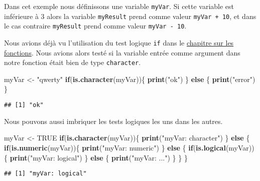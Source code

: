 \documentclass[]{book}
\newenvironment{Shaded}{\begin{snugshade}}{\end{snugshade}}
\newcommand{\KeywordTok}[1]{\textcolor[rgb]{0.13,0.29,0.53}{\textbf{#1}}}
\newcommand{\StringTok}[1]{\textcolor[rgb]{0.31,0.60,0.02}{#1}}
\newcommand{\OtherTok}[1]{\textcolor[rgb]{0.56,0.35,0.01}{#1}}
\newcommand{\ControlFlowTok}[1]{\textcolor[rgb]{0.13,0.29,0.53}{\textbf{#1}}}
\newcommand{\NormalTok}[1]{#1}
\theoremstyle{definition}
\theoremstyle{definition}
\theoremstyle{definition}
\theoremstyle{remark}
\begin{document}
Dans cet exemple nous définissons une variable \texttt{myVar}. Si cette
variable est inférieure à 3 alors la variable \texttt{myResult} prend
comme valeur \texttt{myVar\ +\ 10}, et dans le cas contraire
\texttt{myResult} prend comme valeur \texttt{myVar\ -\ 10}.

Nous avions déjà vu l'utilisation du test logique \texttt{if} dans le
\protect\hyperlink{l015function}{chapitre sur les fonctions}. Nous
avions alors testé si la variable entrée comme argument dans notre
fonction était bien de type \texttt{character}.

\begin{Shaded}
\begin{Highlighting}[]
\NormalTok{myVar <-}\StringTok{ "qwerty"}
\ControlFlowTok{if}\NormalTok{(}\KeywordTok{is.character}\NormalTok{(myVar))\{}
  \KeywordTok{print}\NormalTok{(}\StringTok{"ok"}\NormalTok{)}
\NormalTok{\} }\ControlFlowTok{else}\NormalTok{ \{}
  \KeywordTok{print}\NormalTok{(}\StringTok{"error"}\NormalTok{)}
\NormalTok{\}}
\end{Highlighting}
\end{Shaded}

\begin{verbatim}
## [1] "ok"
\end{verbatim}

Nous pouvons aussi imbriquer les tests logiques les uns dans les autres.

\begin{Shaded}
\begin{Highlighting}[]
\NormalTok{myVar <-}\StringTok{ }\OtherTok{TRUE}
\ControlFlowTok{if}\NormalTok{(}\KeywordTok{is.character}\NormalTok{(myVar))\{}
  \KeywordTok{print}\NormalTok{(}\StringTok{"myVar: character"}\NormalTok{)}
\NormalTok{\} }\ControlFlowTok{else}\NormalTok{ \{}
  \ControlFlowTok{if}\NormalTok{(}\KeywordTok{is.numeric}\NormalTok{(myVar))\{}
    \KeywordTok{print}\NormalTok{(}\StringTok{"myVar: numeric"}\NormalTok{)}
\NormalTok{  \} }\ControlFlowTok{else}\NormalTok{ \{}
    \ControlFlowTok{if}\NormalTok{(}\KeywordTok{is.logical}\NormalTok{(myVar))\{}
      \KeywordTok{print}\NormalTok{(}\StringTok{"myVar: logical"}\NormalTok{)}
\NormalTok{    \} }\ControlFlowTok{else}\NormalTok{ \{}
      \KeywordTok{print}\NormalTok{(}\StringTok{"myVar: ..."}\NormalTok{)}
\NormalTok{    \}}
\NormalTok{  \}}
\NormalTok{\}}
\end{Highlighting}
\end{Shaded}

\begin{verbatim}
## [1] "myVar: logical"
\end{verbatim}
\end{document}
